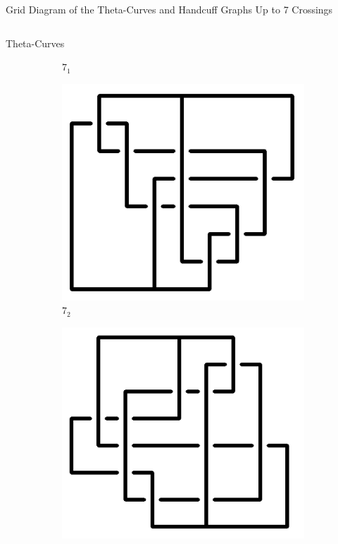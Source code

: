 \documentclass[final]{beamer}
\begin{document}
\begin{frame}[t]
\begin{alertblock}{Grid Diagram of the Theta-Curves and Handcuff Graphs Up to 7 Crossings}
\begin{columns}[t]
\begin{column}{0.5\textwidth}
\begin{alertblock}{Theta-Curves}
\begin{figure}
\begin{subfigure}{0.075\textwidth}
    \caption{$7_{1}$} 
    \end{subfigure}
    \begin{subfigure}{0.075\textwidth}
    \includegraphics[width=\columnwidth]{../Midterm_Poster/grid_diagram/theta_7_2.png}
    \caption{$7_{2}$} 
    \end{subfigure}
    \begin{subfigure}{0.075\textwidth}
    \includegraphics[width=\columnwidth]{../Midterm_Poster/grid_diagram/theta_7_3.png}

\end{subfigure}
\end{figure}
\end{alertblock}
\end{column}
\end{columns}
\end{alertblock}
\end{frame}
\end{document}
